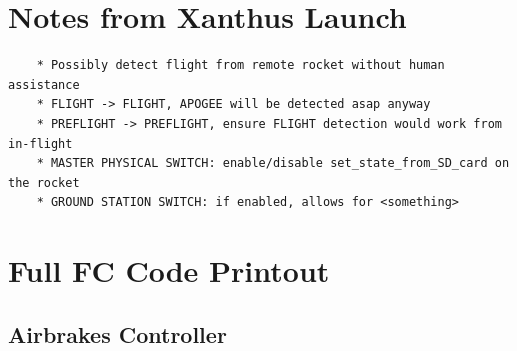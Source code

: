 \documentclass{amsdtx}
\begin{document}
\newpage\section*{Notes from Xanthus Launch}
\begin{verbatim}
	* Possibly detect flight from remote rocket without human assistance
    * FLIGHT -> FLIGHT, APOGEE will be detected asap anyway
    * PREFLIGHT -> PREFLIGHT, ensure FLIGHT detection would work from in-flight
    * MASTER PHYSICAL SWITCH: enable/disable set_state_from_SD_card on the rocket
    * GROUND STATION SWITCH: if enabled, allows for <something>
\end{verbatim}



\newpage\section{Full FC Code Printout}
\subsection*{Airbrakes Controller}

\end{document}
